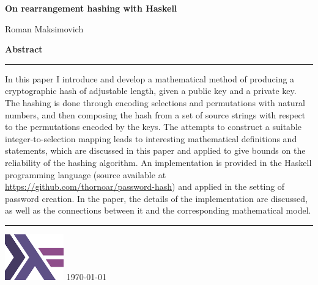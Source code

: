 \documentclass[12pt, a4paper]{article}
\begin{document}

\thispagestyle{empty}
\vspace*{.6in}
{ \Huge\bfseries On rearrangement hashing with Haskell }\par
\vspace*{.1in}
{ \Large Roman Maksimovich }
\par
\vspace*{3.5in}
{ \Large\bfseries Abstract }\par
\vspace*{.1in}
\hrule
\vspace*{.1in}
\begin{minipage}{0.9\textwidth}
    In this paper I introduce and develop a mathematical method of producing a cryptographic hash of adjustable length, given a public key and a private key. The hashing is done through encoding selections and permutations with natural numbers, and then composing the hash from a set of source strings with respect to the permutations encoded by the keys. The attempts to construct a suitable integer-to-selection mapping leads to interesting mathematical definitions and statements, which are discussed in this paper and applied to give bounds on the reliability of the hashing algorithm. An implementation is provided in the Haskell programming language (source available at \url{https://github.com/thornoar/password-hash}) and applied in the setting of password creation. In the paper, the details of the implementation are discussed, as well as the connections between it and the corresponding mathematical model.
\end{minipage}
\vspace*{.1in}
\hrule
\vspace*{.2in}
\begin{center}
    \includegraphics[width = 1in]{./figures/haskell.png}
    \vfill
    \today
\end{center}

\newpage
\tableofcontents
\newpage




\end{document}
